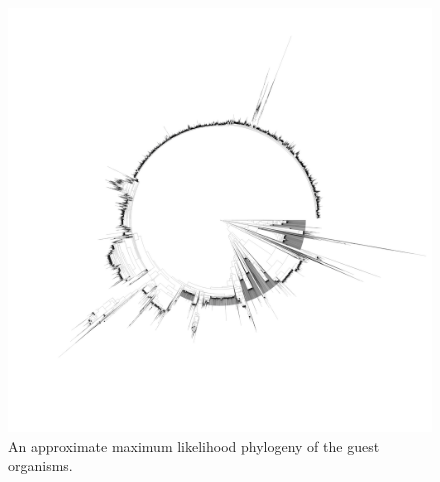 \begin{figure}
    \includegraphics[width=\textwidth]{FishPoo/figures/fishpoo_tree.png}
    \caption{An approximate maximum likelihood phylogeny of the guest organisms.}
    \label{FP_guest_tree}
\end{figure}

